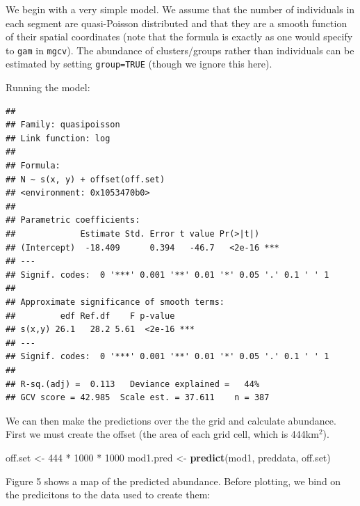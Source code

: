 \documentclass[]{article}
\newenvironment{Shaded}{}{}
\newcommand{\KeywordTok}[1]{\textcolor[rgb]{0.00,0.44,0.13}{\textbf{{#1}}}}
\newcommand{\DecValTok}[1]{\textcolor[rgb]{0.25,0.63,0.44}{{#1}}}
\newcommand{\StringTok}[1]{\textcolor[rgb]{0.25,0.44,0.63}{{#1}}}
\newcommand{\NormalTok}[1]{{#1}}
\begin{document}
We begin with a very simple model. We assume that the number of
individuals in each segment are quasi-Poisson distributed and that they
are a smooth function of their spatial coordinates (note that the
formula is exactly as one would specify to \texttt{gam} in
\texttt{mgcv}). The abundance of clusters/groups rather than individuals
can be estimated by setting \texttt{group=TRUE} (though we ignore this
here).

Running the model:

\begin{Shaded}
\end{Shaded}

\begin{verbatim}
## 
## Family: quasipoisson 
## Link function: log 
## 
## Formula:
## N ~ s(x, y) + offset(off.set)
## <environment: 0x1053470b0>
## 
## Parametric coefficients:
##             Estimate Std. Error t value Pr(>|t|)    
## (Intercept)  -18.409      0.394   -46.7   <2e-16 ***
## ---
## Signif. codes:  0 '***' 0.001 '**' 0.01 '*' 0.05 '.' 0.1 ' ' 1
## 
## Approximate significance of smooth terms:
##         edf Ref.df    F p-value    
## s(x,y) 26.1   28.2 5.61  <2e-16 ***
## ---
## Signif. codes:  0 '***' 0.001 '**' 0.01 '*' 0.05 '.' 0.1 ' ' 1
## 
## R-sq.(adj) =  0.113   Deviance explained =   44%
## GCV score = 42.985  Scale est. = 37.611    n = 387
\end{verbatim}

We can then make the predictions over the the grid and calculate
abundance. First we must create the offset (the area of each grid cell,
which is 444km$^2$).

\begin{Shaded}
\begin{Highlighting}[]
\NormalTok{off.set <-}\StringTok{ }\DecValTok{444} \NormalTok{*}\StringTok{ }\DecValTok{1000} \NormalTok{*}\StringTok{ }\DecValTok{1000}
\NormalTok{mod1.pred <-}\StringTok{ }\KeywordTok{predict}\NormalTok{(mod1, preddata, off.set)}
\end{Highlighting}
\end{Shaded}

Figure 5 shows a map of the predicted abundance. Before plotting, we
bind on the predicitons to the data used to create them:
\end{document}
